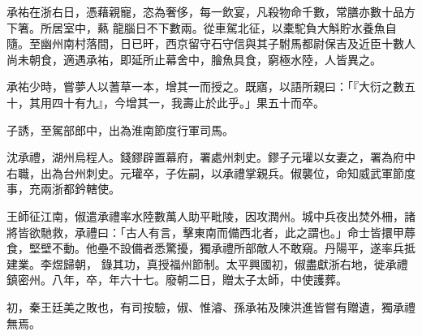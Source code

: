 \begin{pinyinscope}
 承祐在浙右日，憑藉親寵，恣為奢侈，每一飲宴，凡殺物命千數，常膳亦數十品方下箸。所居室中，爇
 龍腦日不下數兩。從車駕北征，以橐駝負大斛貯水養魚自隨。至幽州南村落間，日已旰，西京留守石守信與其子駙馬都尉保吉及近臣十數人尚未朝食，適遇承祐，即延所止幕舍中，膾魚具食，窮極水陸，人皆異之。



 承祐少時，嘗夢人以蓍草一本，增其一而授之。既寤，以語所親曰：「『大衍之數五十，其用四十有九』，今增其一，我壽止於此乎。」果五十而卒。



 子誘，至駕部郎中，出為淮南節度行軍司馬。



 沈承禮，湖州烏程人。錢鏐辟置幕府，署處州刺史。鏐子元瓘以女妻之，署為府中右職，出為台州刺史。元瓘卒，子佐嗣，以承禮掌親兵。俶襲位，命知威武軍節度事，充兩浙都鈐轄使。



 王師征江南，俶遣承禮率水陸數萬人助平毗陵，因攻潤州。城中兵夜出焚外柵，諸將皆欲馳救，承禮曰：「古人有言，擊東南而備西北者，此之謂也。」命士皆擐甲蓐食，堅壁不動。他壘不設備者悉驚擾，獨承禮所部敵人不敢窺。丹陽平，遂率兵抵建業。李煜歸朝，
 錄其功，真授福州節制。太平興國初，俶盡獻浙右地，徙承禮鎮密州。八年，卒，年六十七。廢朝二日，贈太子太師，中使護葬。



 初，秦王廷美之敗也，有司按驗，俶、惟濬、孫承祐及陳洪進皆嘗有贈遺，獨承禮無焉。



\end{pinyinscope}